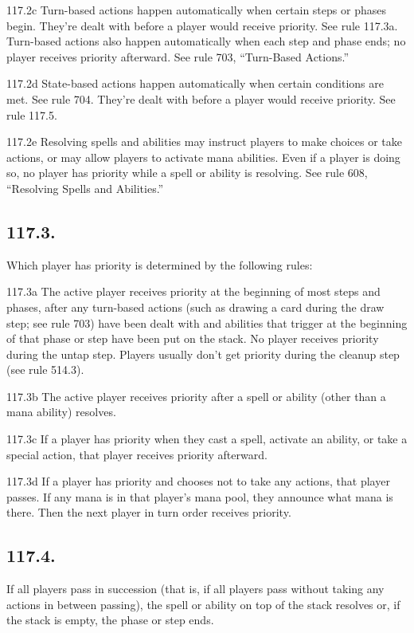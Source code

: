 117.2c Turn-based actions happen automatically when certain steps or phases begin. They’re dealt with before a player would receive priority. See rule 117.3a. Turn-based actions also happen automatically when each step and phase ends; no player receives priority afterward. See rule 703, “Turn-Based Actions.”

117.2d State-based actions happen automatically when certain conditions are met. See rule 704. They’re dealt with before a player would receive priority. See rule 117.5.

117.2e Resolving spells and abilities may instruct players to make choices or take actions, or may allow players to activate mana abilities. Even if a player is doing so, no player has priority while a spell or ability is resolving. See rule 608, “Resolving Spells and Abilities.”

\subsection*{117.3.}
Which player has priority is determined by the following rules:

117.3a The active player receives priority at the beginning of most steps and phases, after any turn-based actions (such as drawing a card during the draw step; see rule 703) have been dealt with and abilities that trigger at the beginning of that phase or step have been put on the stack. No player receives priority during the untap step. Players usually don’t get priority during the cleanup step (see rule 514.3).

117.3b The active player receives priority after a spell or ability (other than a mana ability) resolves.

117.3c If a player has priority when they cast a spell, activate an ability, or take a special action, that player receives priority afterward.

117.3d If a player has priority and chooses not to take any actions, that player passes. If any mana is in that player’s mana pool, they announce what mana is there. Then the next player in turn order receives priority.

\subsection*{117.4.}
If all players pass in succession (that is, if all players pass without taking any actions in between passing), the spell or ability on top of the stack resolves or, if the stack is empty, the phase or step ends.

